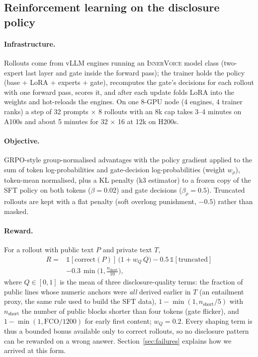 \documentclass[letterpaper]{article} %
\newcommand{\iv}{\textsc{InnerVoice}}
\begin{document}
\subsection{Reinforcement learning on the disclosure policy}\label{sec:rl}
\paragraph{Infrastructure.} Rollouts come from vLLM \citep{kwon2023vllm} engines running an \iv{} model class (two-expert last layer and gate inside the forward pass); the trainer holds the policy (base + LoRA + experts + gate), recomputes the gate's decisions for each rollout with one forward pass, scores it, and after each update folds LoRA into the weights and hot-reloads the engines. On one 8-GPU node (4 engines, 4 trainer ranks) a step of 32 prompts $\times$ 8 rollouts with an 8k cap takes 3--4 minutes on A100s and about 5 minutes for 32 $\times$ 16 at 12k on H200s.

\paragraph{Objective.} GRPO-style group-normalised advantages \citep{shao2024deepseekmath} with the policy gradient applied to the sum of token log-probabilities and gate-decision log-probabilities (weight $w_\rho$), token-mean normalised, plus a KL penalty (k3 estimator) to a frozen copy of the SFT policy on both tokens ($\beta{=}0.02$) and gate decisions ($\beta_\rho{=}0.5$). Truncated rollouts are kept with a flat penalty (soft overlong punishment, $-0.5$) rather than masked.

\paragraph{Reward.} For a rollout with public text $P$ and private text $T$,
\begin{equation}
\begin{aligned}
R = {}& \mathbb{1}[\text{correct}(P)]\,\big(1 + w_Q\,Q\big) - 0.5\,\mathbb{1}[\text{truncated}] \\
 & - 0.3\,\min\!\big(1,\tfrac{n_{\text{short}}}{10}\big),
\end{aligned}
\end{equation}
where $Q\in[0,1]$ is the mean of three disclosure-quality terms: the fraction of public lines whose numeric anchors were \emph{all} derived earlier in $T$ (an entailment proxy, the same rule used to build the SFT data), $1-\min(1, n_{\text{short}}/5)$ with $n_{\text{short}}$ the number of public blocks shorter than four tokens (gate flicker), and $1-\min(1,\mathrm{FCO}/1200)$ for early first content; $w_Q{=}0.2$. Every shaping term is thus a bounded bonus available only to correct rollouts, so no disclosure pattern can be rewarded on a wrong answer. Section~\ref{sec:failures} explains how we arrived at this form.
\end{document}
